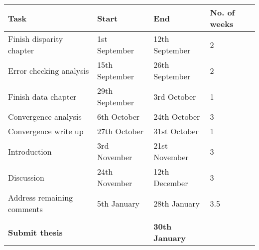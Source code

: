 

\begin{tabular}[t]{l l l l }		
\hline
\textbf{Task} & \textbf{Start} & \textbf{End} & \textbf{No. of weeks} \\ 
\hline
Finish disparity chapter & 1st September & 12th September & 2 \\
Error checking analysis & 15th September & 26th September & 2 \\
Finish data chapter & 29th September & 3rd October & 1 \\
Convergence analysis & 6th October & 24th October & 3 \\
Convergence write up & 27th October & 31st October & 1 \\
Introduction & 3rd November & 21st November & 3 \\
Discussion & 24th November & 12th December & 3 \\
Address remaining comments  & 5th January & 28th January & 3.5 \\
&&&\\
\textbf{Submit thesis} & & \textbf{30th January} & \\ 
\hline
\end{tabular}